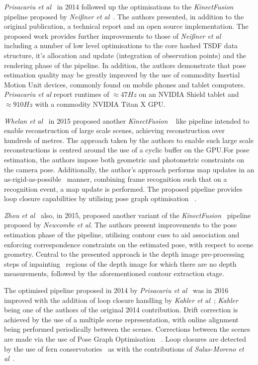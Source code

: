 \textit{Prisacariu et al}~\cite{Prisacariu2014, Kahler2015} in 2014 followed up the optimisations 
to the \textit{KinectFusion} pipeline proposed by \textit{Nei{\ss}ner et al}~\cite{NieBner2013}. 
The authors presented, in addition to the original publication, a technical report and an open 
source implementation. The proposed work provides further improvements to those of 
\textit{Nei{\ss}ner et al}~\cite{NieBner2013} including a number of low level optimisations to the 
core hashed TSDF data structure, it's allocation and update (integration of observation points) and 
the rendering phase of the pipeline. In addition, the authors demonstrate that pose estimation quality 
may be greatly improved by the use of commodity Inertial Motion Unit devices, commonly found 
on mobile phones and tablet computers. \textit{Prisacariu et al} report runtimes of 
\(\approx47Hz\) on an NVIDIA Shield tablet and \(\approx910Hz\) with a commodity NVIDIA Titan X GPU.\@

\textit{Whelan et al}~\cite{Whelan2015} in 2015 proposed another \textit{KinectFusion} 
~\cite{Newcombe2011} like pipeline intended to enable reconstruction of large scale scenes, 
achieving reconstruction over hundreds of metres. The approach taken by the authors to enable 
such large scale reconstructions is centred around the use of a cyclic buffer on the GPU.\@ For pose 
estimation, the authors impose both geometric and photometric constraints on the camera pose. 
Additionally, the author's approach performs map updates in an as-rigid-as-possible~\cite{Igarashi2005} 
manner, combining frame recognition such that on a recognition event, a map update is performed.
The proposed pipeline provides loop closure capabilities by utilising pose graph optimisation 
~\cite{Grisetti2010}.

\textit{Zhou et al}~\cite{Zhou2015} also, in 2015, proposed another variant of the 
\textit{KinectFusion}~\cite{Newcombe2011} pipeline proposed by \textit{Newcombe et al}. 
The authors present improvements to the pose estimation phase of the pipeline, utilising 
contour cues to aid association and enforcing correspondence constraints on the estimated 
pose, with respect to scene geometry. Central to the presented approach is the depth image 
pre-processing steps of inpainting~\cite{Bertalmio2000} regions of the depth image for which 
there are no depth measurements, followed by the aforementioned contour extraction stage.

The optimised pipeline proposed in 2014 by \textit{Prisacariu et al}~\cite{Prisacariu2014} was 
in 2016 improved with the addition of loop closure handling by \textit{Kahler et al}~\cite{Kahler2016}; 
\textit{Kahler} being one of the authors of the original 2014 contribution. Drift correction is achieved 
by the use of a multiple scene representation, with online alignment being performed periodically 
between the scenes. Corrections between the scenes are made via the use of Pose Graph Optimisation 
~\cite{Grisetti2010}. Loop closures are detected by the use of fern conservatories~\cite{Glocker2014} as 
with the contributions of \textit{Salas-Moreno et al}~\cite{Salas-Moreno2013}.

